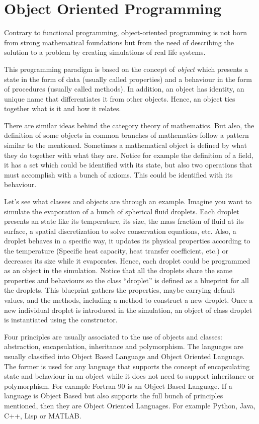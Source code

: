     \newpage 
    \section{Object Oriented Programming}

Contrary to functional programming, object-oriented programming is not born 
from strong mathematical foundations but from the need of describing the solution to a problem 
by creating simulations of real life systems.

This programming paradigm is based on the concept of \textit{object} which presents 
a state in the form of data (usually called properties) and 
a behaviour in the form of procedures (usually called methods).
In addition, an object has identity, an unique name that differentiates it from other objects. 
Hence, an object ties together what is it and how it relates.

There are similar ideas behind the category theory of mathematics.
But also, the definition of some objects in common branches of mathematics follow a pattern similar to the mentioned. 
Sometimes a mathematical object is defined by what they do together with what they are. 
Notice for example the definition of a field, it has a set which could be identified with 
its state, but also two operations that must accomplish with a bunch of axioms. 
This could be identified with its behaviour. 

Let's see what classes and objects are through an example. 
Imagine you want to simulate the evaporation of a bunch of spherical fluid droplets. 
Each droplet presents an state like its temperature, its size, the mass fraction of fluid at its surface, a spatial discretization to solve conservation equations, etc.
Also, a droplet behaves in a specific way, it updates its physical properties according to the temperature (Specific heat capacity, heat transfer coefficient, etc.) or decreases its size while it evaporates.
Hence, each droplet could be programmed as an object in the simulation. 
Notice that all the droplets share the same properties and behaviours so the class ``droplet'' 
is defined as a blueprint for all the droplets.
This blueprint gathers the properties, maybe carrying default values, and the methods, including a method to construct a new droplet. 
Once a new individual droplet is introduced in the simulation, an object of class droplet is instantiated using the constructor. 

Four principles are usually associated to the use of objects and classes: 
abstraction, encapsulation, inheritance and polymorphism. 
The languages are usually classified into Object Based Language and Object Oriented Language.
The former is used for any language that supports the concept of encapsulating state and behaviour 
in an object while it does not need to support inheritance or polymorphism. 
For example Fortran 90 is an Object Based Language.
If a language is Object Based but also supports the full bunch of principles mentioned, then they are Object Oriented Languages. 
For example Python, Java, C++, Lisp or MATLAB.









